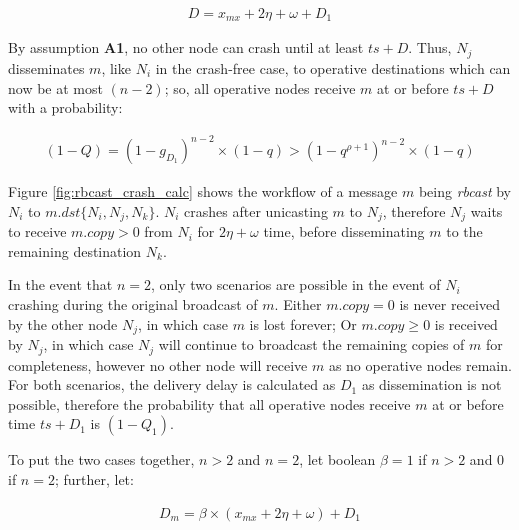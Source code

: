         \begin{equation*}
            \begin{aligned}
                D = x_{mx} + 2\eta + \omega + D_1
            \end{aligned}
        \end{equation*}
        
By assumption \textbf{A1}, no other node can crash until at least $ts+D$. Thus, $N_j$ disseminates $m$, like $N_i$ in the crash-free case, to operative destinations which can now be at most $(n-2)$; so, all operative nodes receive $m$ at or before $ts +D$ with a probability: 
        
        \begin{equation*}
            \begin{aligned}
                (1-Q) = (1-g_{D_1})^{n-2}\times (1-q)>(1-q^{\rho+1})^{n-2}\times(1-q)
            \end{aligned}
        \end{equation*}

Figure \ref{fig:rbcast_crash_calc} shows the workflow of a message $m$ being \emph{rbcast} by $N_i$ to $m.dst \{N_i, N_j, N_k\}$.  $N_i$ crashes after unicasting $m$ to $N_j$, therefore $N_j$ waits to receive $m.copy > 0$ from $N_i$ for $2\eta + \omega$ time, before disseminating $m$ to the remaining destination $N_k$.  

In the event that $n = 2$, only two scenarios are possible in the event of $N_i$ crashing during the original broadcast of $m$.  Either $m.copy = 0$ is never received by the other node $N_j$, in which case $m$ is lost forever; Or $m.copy \geq 0$ is received by $N_j$, in which case $N_j$ will continue to broadcast the remaining copies of $m$ for completeness, however no other node will receive $m$ as no operative nodes remain.  For both scenarios, the delivery delay is calculated as $D_1$ as dissemination is not possible, therefore the probability that all operative nodes receive $m$ at or before time $ts+D_1$ is $(1-Q_1)$.  

To put the two cases together, $n > 2$ and $n = 2$, let boolean $\beta = 1$ if $n>2$ and $0$ if $n=2$; further, let: 

        \begin{equation*}
            \begin{aligned}
                D_m=\beta\times(x_{mx}+2\eta+\omega)+D_1
            \end{aligned}
        \end{equation*}
        
